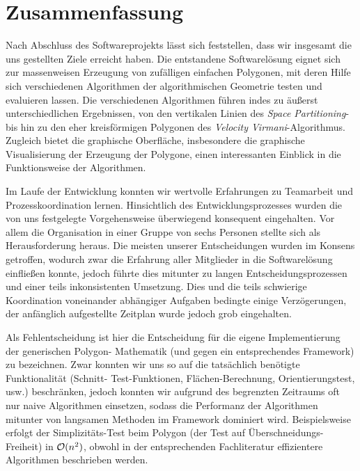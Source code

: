 \section{Zusammenfassung}

  Nach Abschluss des Softwareprojekts lässt sich feststellen, dass wir insgesamt 
  die uns gestellten Ziele erreicht haben.
  Die entstandene Softwarelösung eignet sich zur
  massenweisen Erzeugung von zufälligen einfachen Polygonen, mit deren Hilfe
  sich verschiedenen Algorithmen der algorithmischen Geometrie testen und
  evaluieren lassen. Die verschiedenen Algorithmen führen indes zu äußerst
  unterschiedlichen Ergebnissen, von den vertikalen Linien des \emph{Space
  Partitioning}- bis hin zu den eher kreisförmigen Polygonen des
  \emph{Velocity Virmani}-Algorithmus. Zugleich bietet die graphische
  Oberfläche, insbesondere die graphische Visualisierung der Erzeugung der
  Polygone, einen interessanten Einblick in die Funktionsweise der
  Algorithmen.

  Im Laufe der Entwicklung konnten wir wertvolle Erfahrungen zu Teamarbeit und
  Prozesskoordination lernen. Hinsichtlich des Entwicklungsprozesses wurden die
  von uns festgelegte Vorgehensweise überwiegend konsequent eingehalten. Vor allem
  die Organisation in einer Gruppe von sechs Personen stellte sich als
  Herausforderung heraus. Die meisten unserer Entscheidungen wurden im Konsens
  getroffen, wodurch zwar die Erfahrung aller Mitglieder in die Softwarelösung
  einfließen konnte, jedoch führte dies mitunter zu langen Entscheidungsprozessen und
  einer teils inkonsistenten Umsetzung. Dies und die teils schwierige
  Koordination voneinander abhängiger Aufgaben bedingte einige Verzögerungen,
  der anfänglich aufgestellte Zeitplan wurde jedoch grob eingehalten.

  Als Fehlentscheidung ist hier die
  Entscheidung für die eigene Implementierung der generischen Polygon-
  Mathematik (und gegen ein entsprechendes Framework) zu bezeichnen. Zwar
  konnten wir uns so auf die tatsächlich benötigte Funktionalität (Schnitt-
  Test-Funktionen, Flächen-Berechnung, Orientierungstest, usw.) beschränken,
  jedoch konnten wir aufgrund des begrenzten Zeitraums oft nur naive
  Algorithmen einsetzen, sodass die Performanz der Algorithmen mitunter von
  langsamen Methoden im Framework dominiert wird. Beispielsweise erfolgt der
  Simplizitäts-Test beim Polygon (der Test auf Überschneidungs-Freiheit)
  in $\mathcal{O}(n^2)$, obwohl in der entsprechenden Fachliteratur effizientere
  Algorithmen beschrieben werden.

